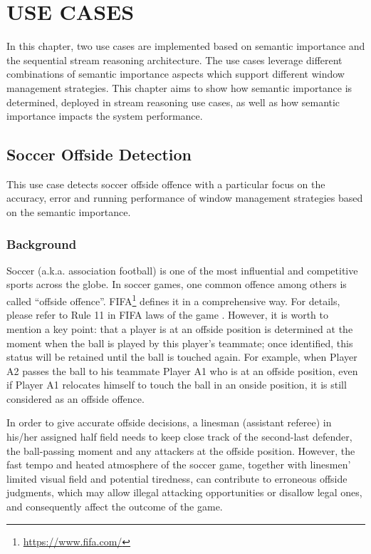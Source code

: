 
\chapter{USE CASES}
In this chapter, two use cases are implemented based on semantic importance and the sequential stream reasoning architecture.
The use cases leverage different combinations of semantic importance aspects which support different window management strategies.
This chapter aims to show how semantic importance is determined, deployed in stream reasoning use cases, as well as how semantic importance impacts the system performance. 
%
\section{Soccer Offside Detection}
This use case detects soccer offside offence with a particular focus on the accuracy, error and running performance of window management strategies based on the semantic importance.
%
\subsection{Background}
Soccer (a.k.a. association football) is one of the most influential and competitive sports across the globe. 
In soccer games, one common offence among others is called ``offside offence''. 
FIFA\footnote{\url{https://www.fifa.com/}} defines it in a comprehensive way.
For details, please refer to Rule 11 in FIFA laws of the game \cite{federation2016laws}.
However, it is worth to mention a key point: that a player is at an offside position is determined at the moment when the ball is played by this player's teammate; once identified, this status will be retained until the ball is touched again. 
For example, when Player A2 passes the ball to his teammate Player A1 who is at an offside position, even if Player A1 relocates himself to touch the ball in an onside position, it is still considered as an offside offence. 

In order to give accurate offside decisions, a linesman (assistant referee) in his/her assigned half field needs to keep close track of the second-last defender, the ball-passing moment and any attackers at the offside position.
However, the fast tempo and heated atmosphere of the soccer game, together with linesmen' limited visual field and potential tiredness, can contribute to erroneous offside judgments, which may allow illegal attacking opportunities or disallow legal ones, and consequently affect the outcome of the game.


